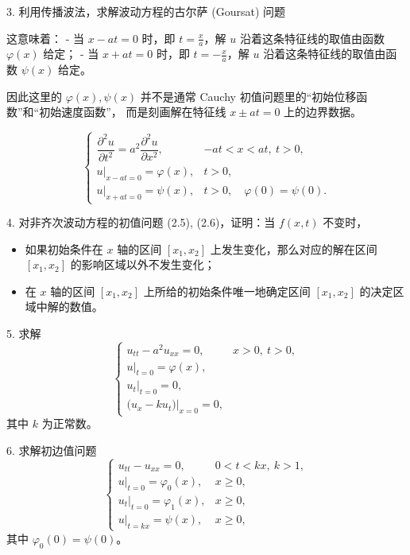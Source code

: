 \begin{exercise}
3. 利用传播波法，求解波动方程的古尔萨 (Goursat) 问题
\begin{dxtips}
   这意味着：
- 当 $x-at=0$ 时，即 $t=\tfrac{x}{a}$，解 $u$ 沿着这条特征线的取值由函数 $\varphi(x)$ 给定；
- 当 $x+at=0$ 时，即 $t=-\tfrac{x}{a}$，解 $u$ 沿着这条特征线的取值由函数 $\psi(x)$ 给定。

因此这里的 $\varphi(x), \psi(x)$ 并不是通常 Cauchy 初值问题里的“初始位移函数”和“初始速度函数”，
而是刻画解在特征线 $x\pm at=0$ 上的边界数据。
\end{dxtips}
\[
\begin{cases}
\dfrac{\partial^2 u}{\partial t^2} = a^2 \dfrac{\partial^2 u}{\partial x^2}, & -at < x < at,\ t>0, \\[6pt]
u\big|_{x-at=0} = \varphi(x), & t>0, \\[6pt]
u\big|_{x+at=0} = \psi(x), & t>0,\quad \varphi(0)=\psi(0).
\end{cases}
\]
\end{exercise}



\begin{exercise}
4. 对非齐次波动方程的初值问题 (2.5), (2.6)，证明：当 $f(x,t)$ 不变时，
\begin{itemize}
\item[(1)] 如果初始条件在 $x$ 轴的区间 $[x_1,x_2]$ 上发生变化，那么对应的解在区间 $[x_1,x_2]$ 的影响区域以外不发生变化；
\item[(2)] 在 $x$ 轴的区间 $[x_1,x_2]$ 上所给的初始条件唯一地确定区间 $[x_1,x_2]$ 的决定区域中解的数值。
\end{itemize}
\end{exercise}

\begin{exercise}
5. 求解
\[
\begin{cases}
u_{tt} - a^2 u_{xx} = 0, & x>0,\ t>0, \\[6pt]
u|_{t=0} = \varphi(x), \\[6pt]
u_t|_{t=0} = 0, \\[6pt]
\big(u_x - ku_t\big)\big|_{x=0} = 0,
\end{cases}
\]
其中 $k$ 为正常数。
\end{exercise}

\begin{exercise}

6. 求解初边值问题
\[
\begin{cases}
u_{tt} - u_{xx} = 0, & 0 < t < kx,\ k>1, \\[6pt]
u|_{t=0} = \varphi_0(x), & x \geq 0, \\[6pt]
u_t|_{t=0} = \varphi_1(x), & x \geq 0, \\[6pt]
u|_{t=kx} = \psi(x), & x \geq 0,
\end{cases}
\]
其中 $\varphi_0(0)=\psi(0)$。
\end{exercise}


